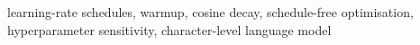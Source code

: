 learning-rate schedules, warmup, cosine decay, schedule-free optimisation, hyperparameter sensitivity, character-level language model
